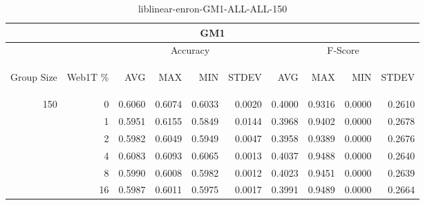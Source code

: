 \begin{center}
\begin{table}[htbp]
\begin{tabular}{ | r | r | r | r | r | r | r | r | r | r |}
\hline
\multicolumn{10}{|c|}{GM1}\\
\hline
 & & \multicolumn{4}{|c|}{Accuracy} & \multicolumn{4}{|c|}{F-Score}\\ \cline{3-10}
\begin{sideways}Group Size\end{sideways} & \begin{sideways}Web1T \%\end{sideways} & \begin{sideways}AVG\end{sideways} & \begin{sideways}MAX\end{sideways} & \begin{sideways}MIN\end{sideways} & \begin{sideways}STDEV\end{sideways} & \begin{sideways}AVG\end{sideways} & \begin{sideways}MAX\end{sideways} & \begin{sideways}MIN\end{sideways} & \begin{sideways}STDEV\end{sideways}\\
\hline
\multirow{6}{*}{150}
 & 0 & 0.6060 & 0.6074 & 0.6033 & 0.0020 & 0.4000 & 0.9316 & 0.0000 & 0.2610\\ \cline{2-10}
 & 1 & 0.5951 & 0.6155 & 0.5849 & 0.0144 & 0.3968 & 0.9402 & 0.0000 & 0.2678\\ \cline{2-10}
 & 2 & 0.5982 & 0.6049 & 0.5949 & 0.0047 & 0.3958 & 0.9389 & 0.0000 & 0.2676\\ \cline{2-10}
 & 4 & 0.6083 & 0.6093 & 0.6065 & 0.0013 & 0.4037 & 0.9488 & 0.0000 & 0.2640\\ \cline{2-10}
 & 8 & 0.5990 & 0.6008 & 0.5982 & 0.0012 & 0.4023 & 0.9451 & 0.0000 & 0.2639\\ \cline{2-10}
 & 16 & 0.5987 & 0.6011 & 0.5975 & 0.0017 & 0.3991 & 0.9489 & 0.0000 & 0.2664\\ \cline{2-10}
\hline
\end{tabular}
\caption{liblinear-enron-GM1-ALL-ALL-150}
\end{table}
\end{center}

